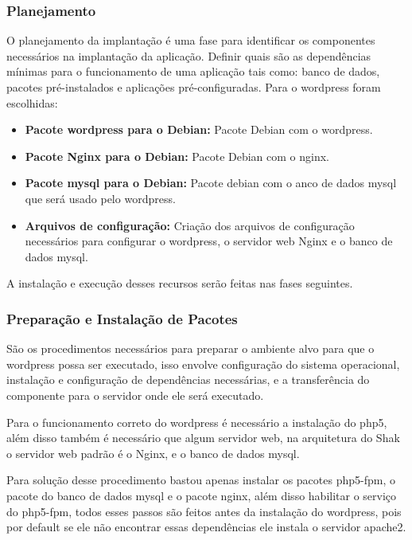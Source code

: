 \subsubsection{Planejamento}

O planejamento da implantação é uma fase para identificar os componentes
necessários na implantação da aplicação. Definir quais são as dependências mínimas
para o funcionamento de uma aplicação tais como: banco de dados, pacotes
pré-instalados e aplicações pré-configuradas. Para o wordpress foram escolhidas:

\begin{itemize}
   \item \textbf{Pacote wordpress para o Debian:} Pacote Debian com o wordpress.
   \item \textbf{Pacote Nginx para o Debian:} Pacote Debian com o nginx.
   \item \textbf{Pacote mysql para o Debian:} Pacote debian com o anco de dados mysql
   que será usado pelo wordpress.
   \item \textbf{Arquivos de configuração:} Criação dos arquivos de configuração
   necessários para configurar o wordpress, o servidor web Nginx e o banco de dados
   mysql.
\end{itemize}

A instalação e execução desses recursos serão feitas nas fases seguintes.

\subsubsection{Preparação e Instalação de Pacotes}

São os procedimentos necessários para preparar o ambiente alvo para que o wordpress
possa ser executado, isso envolve configuração do sistema operacional, instalação
e configuração de dependências necessárias, e a transferência do componente
para o servidor onde ele será executado.

Para o funcionamento correto do wordpress é necessário a instalação do php5, além
disso também é necessário que algum servidor web, na arquitetura do Shak o servidor
web padrão é o Nginx, e o banco de dados mysql.

Para solução desse procedimento bastou apenas instalar os pacotes php5-fpm, o pacote
do banco de dados mysql e o pacote nginx, além disso habilitar o serviço do
php5-fpm, todos esses passos são feitos antes da instalação do wordpress,
pois por default se ele não encontrar essas dependências ele instala o servidor
apache2.


